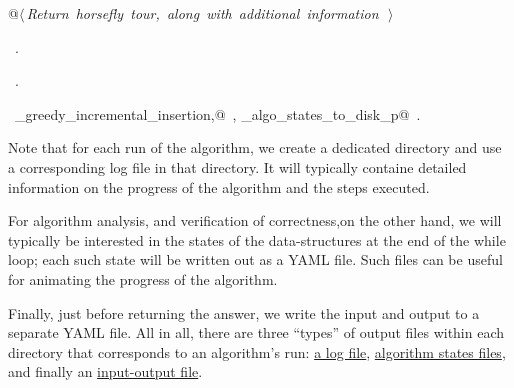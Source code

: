\documentclass[11.5pt]{report}
\begin{document}
\begin{flushleft}
\begin{list}{}{}
\mbox{}\verb@      @\hbox{$\langle\,${\itshape Return horsefly tour, along with additional information}\nobreak\ {\footnotesize {}}$\,\rangle$}\verb@@\\
\mbox{}\verb@@{\NWsep}
\end{list}
\vspace{-1.5ex}
\footnotesize
\begin{list}{}{\setlength{\itemsep}{-\parsep}\setlength{\itemindent}{-\leftmargin}}
\item \NWtxtMacroDefBy\ .
\item \NWtxtMacroRefIn\ .
\item \NWtxtIdentsDefed\nobreak\  \verb@algo_greedy_incremental_insertion,@\nobreak\ , \verb@write_algo_states_to_disk_p@\nobreak\ .
\item{}
\end{list}
\vspace{4ex}
\end{flushleft}
\vspace{-0.8cm}\newchunk Note that for each run of the algorithm, we create a dedicated directory and 
use a corresponding log file  in that directory. It will typically containe detailed 
information on the progress of the algorithm and the steps executed. 

For algorithm analysis, and verification of correctness,on the other hand, we will 
typically  be interested in the states of the data-structures at the end of 
the while loop; each such state will be written out as a YAML file. Such files can 
be useful for animating the progress of the algorithm. 

Finally, just before returning the answer, we write the input and output 
to a separate YAML file. All in all, there are three ``types'' of output files
within each directory that corresponds to an algorithm's run: 
\underline{a log file}, \underline{algorithm states files}, and finally 
an \underline{input-output file}. 
\end{document}
